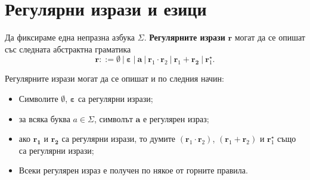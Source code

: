 \section{Регулярни изрази и езици}

Да фиксираме една непразна азбука $\Sigma$.
{\bf Регулярните изрази} $\mathbf{r}$ могат да се опишат със следната абстрактна граматика
\[\mathbf{r} ::= \bm{\emptyset}\ |\ \bm{\varepsilon}\ |\ \mathbf{a}\ |\ \bm{r}_1 \cdot \bm{r}_2\ |\ \bm{r}_1 + \bm{r_2}\ |\ \bm{r}^\star_1.\]

Регулярните изрази могат да се опишат и по следния начин:
\begin{itemize}
\item 
  Символите $\bm{\emptyset}$, $\bm{\varepsilon}$ са регулярни изрази;
\item
  за всяка буква $a \in \Sigma$, символът $\bm{a}$ е регулярен израз;
\item
  ако $\mathbf{r_1}$ и $\mathbf{r_2}$ са регулярни изрази, то думите $(\bm{r}_1 \cdot \bm{r}_2)$, $(\bm{r}_1 + \bm{r}_2)$ и $\bm{r}^\star_1$
  също са регулярни изрази;
\item
  Всеки регулярен израз е получен по някое от горните правила.
\end{itemize}

